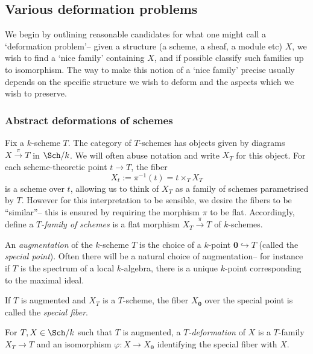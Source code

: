 \subsection{Various deformation problems}
\label{subsec-various-deformation-problems}

We begin by outlining reasonable candidates for what one might call a
`deformation problem'-- given a structure (a scheme, a sheaf, a module etc)
\(X\), we wish to find a `nice family' containing \(X\), and if possible
classify such families up to isomorphism. The way to make this notion of a `nice
family' precise usually depends on the specific structure we wish to deform and
the aspects which we wish to preserve.

\subsubsection{Abstract deformations of schemes}
Fix a \(k\)-scheme \(T\). The category of \(T\)-schemes has objects given by diagrams
\(X\xrightarrow{\;\pi\;}T\) in \(\Sch/k\). We will often abuse notation and
write \(X_T\) for this object. For each scheme-theoretic point \(t\rightarrow
T\), the fiber 
\[X_t := \pi^{-1}(t) = t\times_T X_T \] 
is a scheme over \(t\), allowing us to think of \(X_T\) as a family of schemes
parametrised by \(T\). However for this interpretation to be sensible, we desire
the fibers to be ``similar''-- this is ensured by requiring the morphism \(\pi\)
to be flat. Accordingly, define a \textit{\(T\)-family of schemes} is a flat
morphism \(X_T\xrightarrow{\;\pi\;}T\) of \(k\)-schemes.

An \textit{augmentation} of the \(k\)-scheme \(T\) is the choice of a
\(k\)-point \(\mathbold{0} \hookrightarrow T\) (called the \textit{special
point}). Often there will be a natural choice of augmentation-- for instance if
\(T\) is the spectrum of a local \(k\)-algebra, there is a unique \(k\)-point
corresponding to the maximal ideal. 

If \(T\) is augmented and \(X_T\) is a \(T\)-scheme, the fiber \(X_\mathbold{0}\)
over the special point is called the \textit{special fiber}.

\begin{definition}
    \label{def-defthy-abstractscheme}
    For \(T,X\in \Sch/k\) such that \(T\) is augmented, a
    \textit{\(T\)-deformation} of \(X\) is a \(T\)-family
    \(X_T\rightarrow T\) and an isomorphism \(\varphi: X\rightarrow
    X_\mathbold{0}\) identifying the special fiber with \(X\).
\end{definition}

